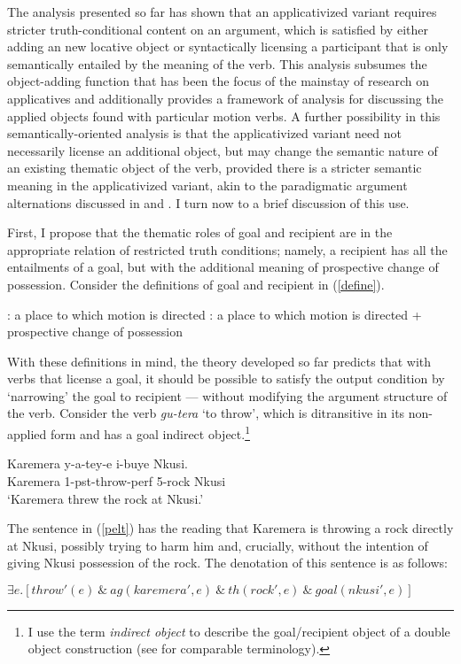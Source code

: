 \documentclass[output=paper]{langsci/langscibook}
\begin{document}
The analysis presented so far has shown that an applicativized variant requires stricter truth-conditional content on an argument, which is satisfied by either adding an new locative object or syntactically licensing a participant that is only semantically entailed by the meaning of the verb. This analysis subsumes the object-adding function that has been the focus of the mainstay of research on applicatives and additionally provides a framework of analysis for discussing the applied objects found with particular motion verbs. A further possibility in this semantically-oriented analysis is that the applicativized variant need not necessarily license an additional object, but may change the semantic nature of an existing thematic object of the verb, provided there is a stricter semantic meaning in the applicativized variant, akin to the paradigmatic argument alternations discussed in \citet{ackermanmoore:2001} and \citet{beavers:2010b}. I turn now to a brief discussion of this use.

First, I propose that the thematic roles of {\sc goal} and {\sc recipient} are in the appropriate relation of restricted truth conditions; namely, a {\sc recipient} has all the entailments of a {\sc goal}, but with the additional meaning of prospective change of possession. Consider the definitions of {\sc goal} and {\sc recipient} in (\ref{define}).

 \begin{exe}
 	\ex\label{define}\begin{xlist} 
		: a place to which motion is directed 
		: a place to which motion is directed + prospective change of possession
	\end{xlist}
\end{exe}
With these definitions in mind, the theory developed so far predicts that with verbs that license a {\sc goal}, it should be possible to satisfy the output condition by  `narrowing' the {\sc goal} to {\sc recipient} --- without modifying the argument structure of the verb. Consider the verb \emph{gu-tera} `to throw', which is ditransitive in its non-applied form and has a {\sc goal} indirect object.\footnote{I use the term \emph{indirect object} to describe the {\sc goal/recipient} object of a double object construction (see \citealt{beavers:2011a} for comparable terminology).}

\begin{exe}
\ex\label{pelt}\gll Karemera y-a-tey-e i-buye Nkusi.\\
	Karemera 1-{\sc pst-}throw-{\sc perf} 5-rock Nkusi\\
	\glt `Karemera threw the rock at Nkusi.'
\end{exe}
 The sentence in (\ref{pelt}) has the reading that Karemera is throwing a rock directly at Nkusi, possibly trying to harm him and, crucially, without the intention of giving Nkusi possession of the rock. The denotation of this sentence is as follows:
\begin{exe}
\ex\label{bernie} $\exists e.[throw'(e) \ \&\ ag(karemera', e) \ \&\ th(rock', e) \ \&\ goal(nkusi', e)]$ 

\end{exe}
\end{document}
